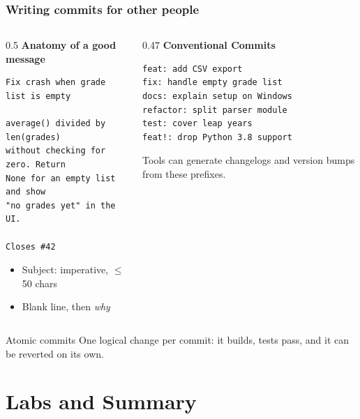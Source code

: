 \documentclass[aspectratio=169,10pt,compress]{beamer}
\begin{document}
\begin{frame}[t,fragile] \frametitle{Writing commits for other people}
  \begin{columns}[T]
    \begin{column}{0.5\textwidth}
      \textbf{Anatomy of a good message}
\begin{lstlisting}[language={}]
Fix crash when grade list is empty

average() divided by len(grades)
without checking for zero. Return
None for an empty list and show
"no grades yet" in the UI.

Closes #42
\end{lstlisting}
      \small
      \begin{itemize}
        \item Subject: imperative, $\le$ 50 chars
        \item Blank line, then \emph{why}
      \end{itemize}
    \end{column}
    \begin{column}{0.47\textwidth}
      \textbf{Conventional Commits}
\begin{lstlisting}[language={}]
feat: add CSV export
fix: handle empty grade list
docs: explain setup on Windows
refactor: split parser module
test: cover leap years
feat!: drop Python 3.8 support
\end{lstlisting}
      \small
      Tools can generate changelogs and version bumps from these prefixes.
    \end{column}
  \end{columns}

  \begin{block}{Atomic commits}
    One logical change per commit: it builds, tests pass, and it can be reverted on its own.
  \end{block}
\end{frame}

\section[Labs]{Labs and Summary}
\end{document}
